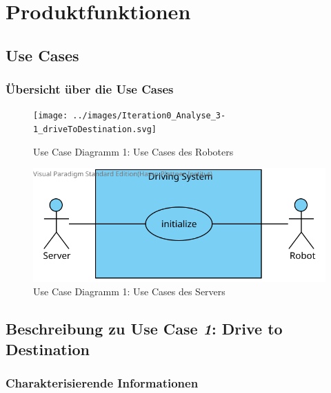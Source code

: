 \documentclass[includeheaders]{scrartcl}
\begin{document}
	\pagebreak

	\section{Produktfunktionen}

		\subsection{Use Cases}
		
		\subsubsection{Übersicht über die Use Cases}
		
			\begin{figure}[H]
				\centering
				\texttt{[image: ../images/Iteration0\_Analyse\_3-1\_driveToDestination.svg]}
				\caption{Use Case Diagramm 1: Use Cases des Roboters}
				\label{fig:3-1-robot-use-cases}
			\end{figure}

			\begin{figure}[H]
				\centering
				\includegraphics[width=\textwidth]{../images/Iteration0_Analyse_3-1_DrivingSystem.svg}
				\caption{Use Case Diagramm 1: Use Cases des Servers}
				\label{fig:3-1-server-use-cases}
			\end{figure}


		\subsection{Beschreibung zu Use Case \emph{1}: Drive to Destination}

			\subsubsection*{Charakterisierende Informationen}
\end{document}
